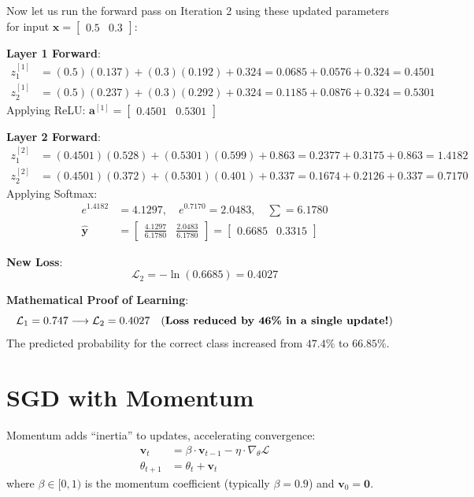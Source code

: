 \documentclass[12pt, a4paper]{report}
\theoremstyle{definition}
\begin{document}
\begin{numexample}
Now let us run the forward pass on Iteration 2 using these updated parameters for input $\mathbf{x} = \begin{bmatrix} 0.5 & 0.3 \end{bmatrix}$:

\textbf{Layer 1 Forward}:
\begin{align*}
z_1^{[1]} &= (0.5)(0.137) + (0.3)(0.192) + 0.324 = 0.0685 + 0.0576 + 0.324 = 0.4501 \\
z_2^{[1]} &= (0.5)(0.237) + (0.3)(0.292) + 0.324 = 0.1185 + 0.0876 + 0.324 = 0.5301
\end{align*}
Applying ReLU: $\mathbf{a}^{[1]} = \begin{bmatrix} 0.4501 & 0.5301 \end{bmatrix}$

\textbf{Layer 2 Forward}:
\begin{align*}
z_1^{[2]} &= (0.4501)(0.528) + (0.5301)(0.599) + 0.863 = 0.2377 + 0.3175 + 0.863 = 1.4182 \\
z_2^{[2]} &= (0.4501)(0.372) + (0.5301)(0.401) + 0.337 = 0.1674 + 0.2126 + 0.337 = 0.7170
\end{align*}
Applying Softmax:
\begin{align*}
e^{1.4182} &= 4.1297, \quad e^{0.7170} = 2.0483, \quad \sum = 6.1780 \\
\hat{\mathbf{y}} &= \begin{bmatrix} \frac{4.1297}{6.1780} & \frac{2.0483}{6.1780} \end{bmatrix} = \begin{bmatrix} 0.6685 & 0.3315 \end{bmatrix}
\end{align*}

\textbf{New Loss}:
\[
\mathcal{L}_2 = -\ln(0.6685) = \boxed{0.4027}
\]

\textbf{Mathematical Proof of Learning}:
\[
\mathcal{L}_1 = 0.747 \longrightarrow \mathcal{L}_2 = 0.4027 \quad \text{(\textbf{Loss reduced by 46\% in a single update!})}
\]
The predicted probability for the correct class increased from $47.4\%$ to $66.85\%$.
\end{numexample}

\section{SGD with Momentum}

Momentum adds ``inertia'' to updates, accelerating convergence:
\begin{align}
    \mathbf{v}_t &= \beta \cdot \mathbf{v}_{t-1} - \eta \cdot \nabla_\theta \mathcal{L} \\
    \theta_{t+1} &= \theta_t + \mathbf{v}_t
\end{align}
where $\beta \in [0, 1)$ is the momentum coefficient (typically $\beta = 0.9$) and $\mathbf{v}_0 = \mathbf{0}$.
\end{document}
